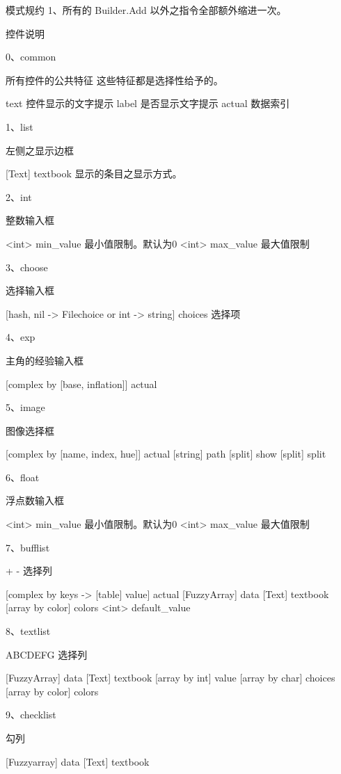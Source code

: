 模式规约
1、所有的 Builder.Add 以外之指令全部额外缩进一次。

控件说明

0、common
	
	所有控件的公共特征
	这些特征都是选择性给予的。

	text 控件显示的文字提示
	label 是否显示文字提示
	actual 数据索引

1、list
	
	左侧之显示边框
	
	[Text] textbook 显示的条目之显示方式。

2、int
	
	整数输入框

	<int> min_value 最小值限制。默认为0
	<int> max_value 最大值限制

3、choose

	选择输入框

	[hash, nil -> Filechoice or int -> string] choices 选择项

4、exp

	主角的经验输入框

	[complex by [base, inflation]] actual

5、image

	图像选择框

	[complex by [name, index, hue]] actual
	[string] path
	[split] show
	[split] split

6、float

	浮点数输入框

	<int> min_value 最小值限制。默认为0
	<int> max_value 最大值限制

7、bufflist

	+ - 选择列

	[complex by keys -> [table] value] actual
	[FuzzyArray]                       data
	[Text]                             textbook
	[array by color]                   colors
	<int>                              default_value

8、textlist

	ABCDEFG 选择列

	[FuzzyArray]     data
	[Text]           textbook
	[array by int]   value
	[array by char]  choices
	[array by color] colors

9、checklist

	勾列
	
	[Fuzzyarray]  data
	[Text]				textbook
